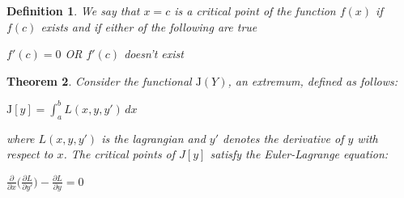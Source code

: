 \documentclass[a4paper]{book}
\newtheorem{theorem}{Theorem}%
\newtheorem{definition}[theorem]{Definition}%
\numberwithin{theorem}{section}%
\begin{document}
\begin{definition}
    We say that $x=c$ is a critical point of the function $f(x)$ if $f(c)$ exists and if either of the following are true
    \begin{center}
        $f'(c)=0$ OR $f'(c)$ doesn't exist
    \end{center}
\end{definition}

\begin{theorem}
	Consider the functional $\mathrm{J}(Y)$, an extremum, defined as follows:
	\begin{center}
		$\displaystyle \mathrm{J}[y]=\int_{a}^{b}L(x,y,y')\,dx$
	\end{center}
	where $L(x,y,y')$ is the lagrangian and $y'$ denotes the derivative of $y$ with respect to $x$. The critical points of $J[y]$ satisfy the Euler-Lagrange equation:
	\begin{center}
		$\displaystyle \frac{\partial}{\partial x}\Big(\frac{\partial L}{\partial y'}\Big)-\frac{\partial L}{\partial y}=0$
	\end{center}
\end{theorem}
\end{document}
